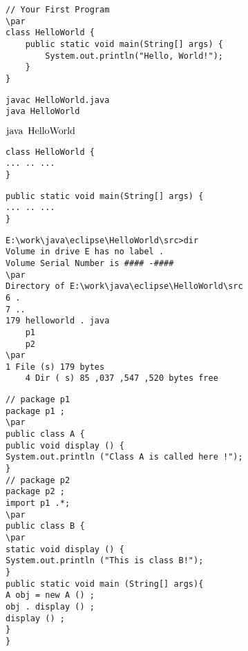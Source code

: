 \documentclass{book}
\def\lthtmlcheckvsize{\ifdim\ht\sizebox<\vsize 
  \ifdim\wd\sizebox<\hsize\expandafter\hfill\fi \expandafter\vfill
  \else\expandafter\vss\fi}%
\begin{document}
{\newpage\clearpage
{}%
\begin{lstlisting}
// Your First Program
\par
class HelloWorld {
    public static void main(String[] args) {
        System.out.println("Hello, World!"); 
    }
}
\end{lstlisting}%
\lthtmlfigureZ
\lthtmlcheckvsize\clearpage}

{\newpage\clearpage
{}%
\begin{lstlisting}
javac HelloWorld.java
java HelloWorld
\end{lstlisting}%
\lthtmlfigureZ
\lthtmlcheckvsize\clearpage}

{\newpage\clearpage
{}%
$\lstinline{java HelloWorld}$%
\lthtmlindisplaymathZ
\lthtmlcheckvsize\clearpage}

{\newpage\clearpage
{}%
\begin{lstlisting}
class HelloWorld {
... .. ...
}
\end{lstlisting}%
\lthtmlfigureZ
\lthtmlcheckvsize\clearpage}

{\newpage\clearpage
{}%
\begin{lstlisting}
public static void main(String[] args) {
... .. ...
}
\end{lstlisting}%
\lthtmlfigureZ
\lthtmlcheckvsize\clearpage}

{\newpage\clearpage
{}%
\begin{lstlisting}
E:\work\java\eclipse\HelloWorld\src>dir
Volume in drive E has no label .
Volume Serial Number is #### -####
\par
Directory of E:\work\java\eclipse\HelloWorld\src
6 .
7 ..
179 helloworld . java
	p1
	p2
\par
1 File (s) 179 bytes
	4 Dir ( s) 85 ,037 ,547 ,520 bytes free
\end{lstlisting}%
\lthtmlfigureZ
\lthtmlcheckvsize\clearpage}

{\newpage\clearpage
{}%
\begin{lstlisting}
// package p1
package p1 ;
\par
public class A {
public void display () {
System.out.println ("Class A is called here !");
}
// package p2
package p2 ;
import p1 .*;
\par
public class B {
\par
static void display () {
System.out.println ("This is class B!");
}
public static void main (String[] args){
A obj = new A () ;
obj . display () ;
display () ;
}
}
\end{lstlisting}%
\lthtmlfigureZ
\lthtmlcheckvsize\clearpage}
\end{document}
